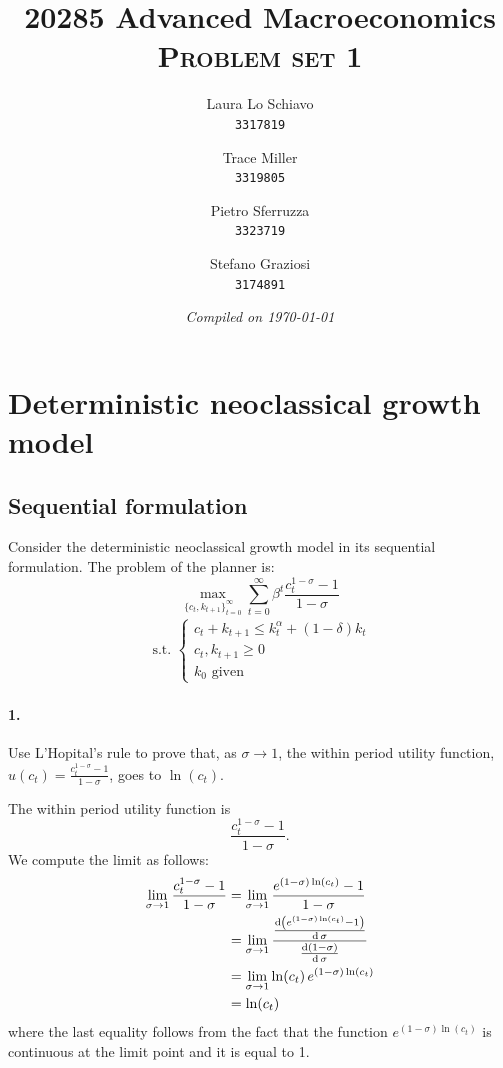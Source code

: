 \documentclass[dvipsnames,11pt]{article}
\title{20285 Advanced Macroeconomics \\[0.5cm] \Huge \textsc{Problem set 1}}
\author{
        Laura Lo Schiavo \\
        \texttt{3317819}
        \and 
        Trace Miller \\
        \texttt{3319805}
        \and 
        Pietro Sferruzza \\
        \texttt{3323719}
        \and
        Stefano Graziosi\\
        \texttt{3174891}
        }
\date{\emph{Compiled on \today}}
\begin{document}
\maketitle

\tableofcontents

\vspace{0.5cm}

\section{Deterministic neoclassical growth model}

    \subsection{Sequential formulation}

        Consider the deterministic neoclassical growth model in its sequential formulation. The problem of the planner is:
        \begin{equation*}
            \max_{\{c_t, k_{t+1}\}_{t=0}^\infty} \sum_{t=0}^{\infty} \beta^t \frac{c_t^{1-\sigma}-1}{1-\sigma}
        \end{equation*}
        \begin{align*}
        \text{ s.t. }
            \begin{cases}
            c_t + k_{t+1} \leq k_t^\alpha + (1 - \delta) k_t \\
            c_t, k_{t+1} \geq 0 \\
            k_0 \text{ given}
            \end{cases}
        \end{align*}

\paragraph{1.} Use L'Hopital's rule to prove that, as $\sigma \to 1$, the within period utility function, $u(c_t) = \frac{c_t^{1-\sigma} - 1}{1-\sigma}$, goes to $\ln(c_t)$.
           
\begin{solution}
The within period utility function is 
\[\frac{c_t^{1-\sigma} -1 }{1 - \sigma}.\]
We compute the limit as follows:
\begin{align*}
   \lim_{\sigma \to 1} \frac{c_t^{1-\sigma} - 1}{1 - \sigma} & =  \lim_{\sigma \to 1} \frac{e^{(1 - \sigma)\ln(c_t)} - 1}{1 - \sigma} \\
   & =  \lim_{\sigma \to 1} \frac{\frac{\operatorname{\text{d}} \left(e^{(1 - \sigma)\ln(c_t)} -1\right)}{\operatorname{\text{d}} \sigma}}{\frac{\operatorname{\text{d}}(1 - \sigma)}{\operatorname{\text{d}} \sigma}} \\
   & = \lim_{\sigma \to 1} \ln(c_t)\,e^{(1 - \sigma)\ln(c_t)} \\
   & = \ln(c_t)
\end{align*}
where the last equality follows from the fact that the function $e^{(1-\sigma)\ln(c_t)}$ is continuous at the limit point and it is equal to 1. 
\end{solution}
\end{document}

